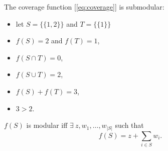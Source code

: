 \begin{ex}
    The coverage function [\ref{eq:coverage}] is submodular:
    \begin{itemize}
        \item let $S=\{\{1,2\}\}$ and $T = \{\{1\}\}$
        \item $f(S)=2$ and $f(T)=1$,
        \item $f(S \cap T) = 0$,
        \item $f(S \cup T) = 2$,
        \item $f(S) + f(T) = 3$,
        \item $3 > 2$.
    \end{itemize}    
\end{ex}

\begin{thm}\label{thm:modular}
    $f(S)$ is modular iff $\exists\ z, w_1, \ldots, w_{|S|}$ such that
    \begin{equation}
        f(S) = z + \sum_{i \in S} w_i.
    \end{equation}
\end{thm}
